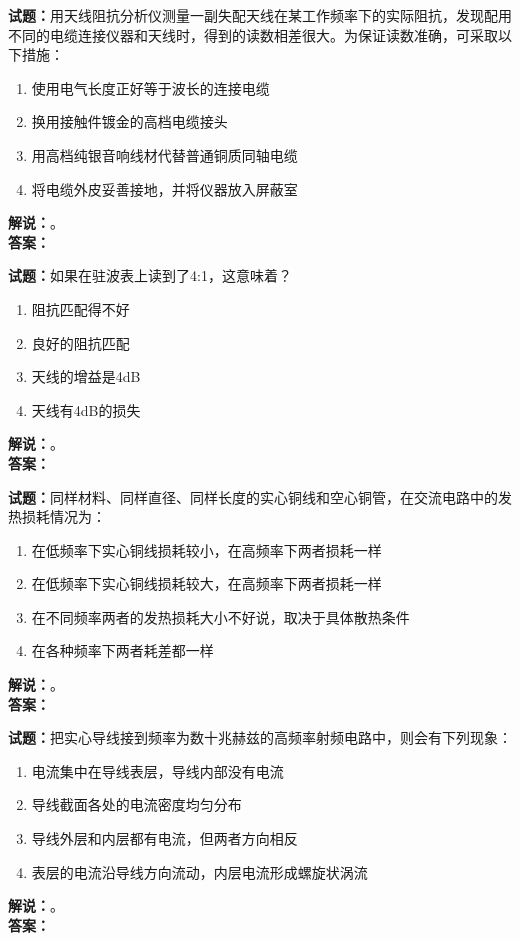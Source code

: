 \documentclass{ctexbook}
\begin{document}
\bigskip

\noindent\textbf{试题：}用天线阻抗分析仪测量一副失配天线在某工作频率下的实际阻抗，发现配用不同的电缆连接仪器和天线时，得到的读数相差很大。为保证读数准确，可采取以下措施：
\begin{enumerate}[leftmargin=3em]
  \item 使用电气长度正好等于波长的连接电缆
  \item 换用接触件镀金的高档电缆接头
  \item 用高档纯银音响线材代替普通铜质同轴电缆
  \item 将电缆外皮妥善接地，并将仪器放入屏蔽室
\end{enumerate}
\noindent\textbf{解说：}\textbf{}。\\\noindent\textbf{答案：}

\bigskip

\noindent\textbf{试题：}如果在驻波表上读到了4:1，这意味着？
\begin{enumerate}[leftmargin=3em]
  \item 阻抗匹配得不好
  \item 良好的阻抗匹配
  \item 天线的增益是4dB
  \item 天线有4dB的损失
\end{enumerate}
\noindent\textbf{解说：}\textbf{}。\\\noindent\textbf{答案：}

\bigskip

\noindent\textbf{试题：}同样材料、同样直径、同样长度的实心铜线和空心铜管，在交流电路中的发热损耗情况为：
\begin{enumerate}[leftmargin=3em]
  \item 在低频率下实心铜线损耗较小，在高频率下两者损耗一样
  \item 在低频率下实心铜线损耗较大，在高频率下两者损耗一样
  \item 在不同频率两者的发热损耗大小不好说，取决于具体散热条件
  \item 在各种频率下两者耗差都一样
\end{enumerate}
\noindent\textbf{解说：}\textbf{}。\\\noindent\textbf{答案：}

\bigskip

\noindent\textbf{试题：}把实心导线接到频率为数十兆赫兹的高频率射频电路中，则会有下列现象：
\begin{enumerate}[leftmargin=3em]
  \item 电流集中在导线表层，导线内部没有电流
  \item 导线截面各处的电流密度均匀分布
  \item 导线外层和内层都有电流，但两者方向相反
  \item 表层的电流沿导线方向流动，内层电流形成螺旋状涡流
\end{enumerate}
\noindent\textbf{解说：}\textbf{}。\\\noindent\textbf{答案：}
\end{document}
